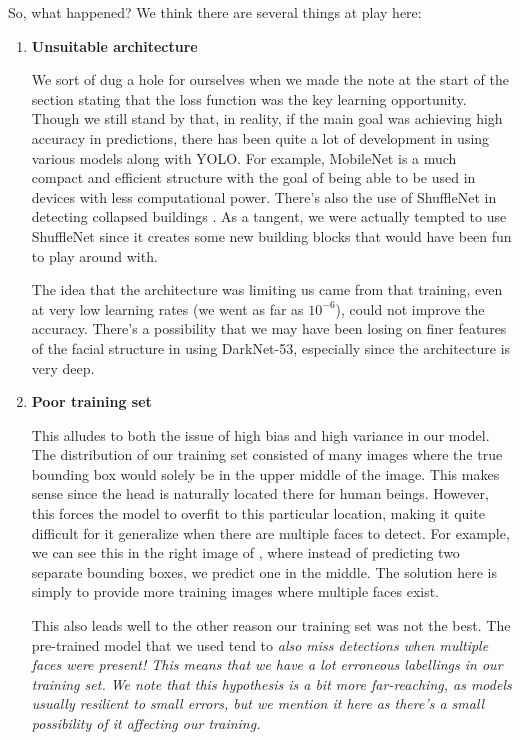 So, what happened?
We think there are several things at play here:
\begin{enumerate}[left=0pt]
\item \bf{Unsuitable architecture}

We sort of dug a hole for ourselves when we made the note at the start of the section stating that the loss function was the key learning opportunity.
Though we still stand by that, in reality, if the main goal was achieving high accuracy in predictions, there has been quite a lot of development in using various models along with YOLO.
For example, MobileNet \cite{mobilenet} is a much compact and efficient structure with the goal of being able to be used in devices with less computational power.
There's also the use of ShuffleNet \cite{shufflenet} in detecting collapsed buildings \cite{shufflenetBuildings}.
As a tangent, we were actually tempted to use ShuffleNet since it creates some new building blocks that would have been fun to play around with.

The idea that the architecture was limiting us came from that training, even at very low learning rates (we went as far as $10^{-6}$), could not improve the accuracy.
There's a possibility that we may have been losing on finer features of the facial structure in using DarkNet-53, especially since the architecture is very deep.

\item \bf{Poor training set}

This alludes to both the issue of high bias and high variance in our model.
The distribution of our training set consisted of many images where the true bounding box would solely be in the upper middle of the image.
This makes sense since the head is naturally located there for human beings.
However, this forces the model to overfit to this particular location, making it quite difficult for it generalize when there are multiple faces to detect.
For example, we can see this in the right image of , where instead of predicting two separate bounding boxes, we predict one in the middle.
The solution here is simply to provide more training images where multiple faces exist.

This also leads well to the other reason our training set was not the best.
The pre-trained model that we used tend to \it{also} miss detections when multiple faces were present!
This means that we have a lot erroneous labellings in our training set.
We note that this hypothesis is a bit more far-reaching, as models usually resilient to small errors, but we mention it here as there's a small possibility of it affecting our training.


\end{enumerate}
